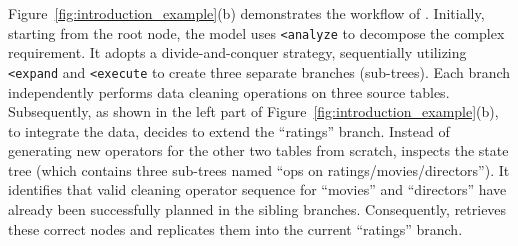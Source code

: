 \begin{example}
\label{exam:agentic_tree_based_reasoning}

    Figure~\ref{fig:introduction_example}(b) demonstrates the workflow of \sys.
    Initially, starting from the root node, the model uses \texttt{<analyze} to decompose the complex requirement. It adopts a divide-and-conquer strategy, sequentially utilizing \texttt{<expand} and \texttt{<execute} to create three separate branches (sub-trees). Each branch independently performs data cleaning operations on three source tables.
    Subsequently, as shown in the left part of Figure~\ref{fig:introduction_example}(b), to integrate the data, \sys decides to extend the ``{ratings}'' branch. Instead of generating new operators for the other two tables from scratch, \sys inspects the state tree (which contains three sub-trees named ``ops on ratings/movies/directors''). It identifies that valid cleaning operator sequence for ``{movies}'' and ``{directors}'' have already been successfully planned in the sibling branches. Consequently, \sys retrieves these correct nodes and replicates them into the current ``{ratings}'' branch. 

\end{example}
